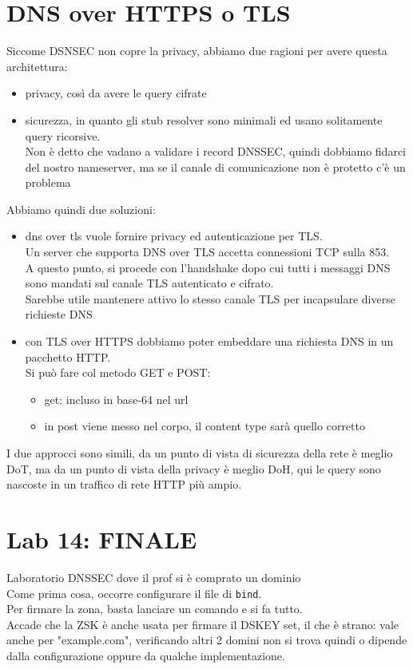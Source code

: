 \documentclass[12pt, oneside]{extbook} %
\begin{document}
\section{DNS over HTTPS o TLS}
Siccome DSNSEC non copre la privacy, abbiamo due ragioni per avere questa architettura:
\begin{itemize}
	\item privacy, così da avere le query cifrate
	\item sicurezza, in quanto gli stub resolver sono minimali ed usano solitamente query ricorsive.
    \\Non è detto che vadano a validare i record DNSSEC, quindi dobbiamo fidarci del nostro nameserver, ma se il canale di comunicazione non è protetto c'è un problema
\end{itemize}
Abbiamo quindi due soluzioni:
\begin{itemize}
	\item dns over tls vuole fornire privacy ed autenticazione per TLS.
    \\Un server che supporta DNS over TLS accetta connessioni TCP sulla 853.
    \\A questo punto, si procede con l'handshake dopo cui tutti i messaggi DNS sono mandati sul canale TLS autenticato e cifrato.
    \\Sarebbe utile mantenere attivo lo stesso canale TLS per incapsulare diverse richieste DNS
	\item con TLS over HTTPS dobbiamo poter embeddare una richiesta DNS in un pacchetto HTTP.
    \\Si può fare col metodo GET e POST:
	\begin{itemize}
		\item get: incluso in base-64 nel url
		\item in post viene messo nel corpo, il content type sarà quello corretto
	\end{itemize}
\end{itemize}
I due approcci sono simili, da un punto di vista di sicurezza della rete è meglio DoT, ma da un punto di vista della privacy è meglio DoH, qui le query sono nascoste in un traffico di rete HTTP più ampio.

\section{Lab 14: FINALE}
Laboratorio DNSSEC dove il prof si è comprato un dominio
\\Come prima cosa, occorre configurare il file di \texttt{bind}.
\\Per firmare la zona, basta lanciare un comando e si fa tutto.
\\Accade che la ZSK è anche usata per firmare il DSKEY set, il che è strano: vale anche per "example.com", verificando altri 2 domini non si trova quindi o dipende dalla configurazione oppure da qualche implementazione.
\end{document}

